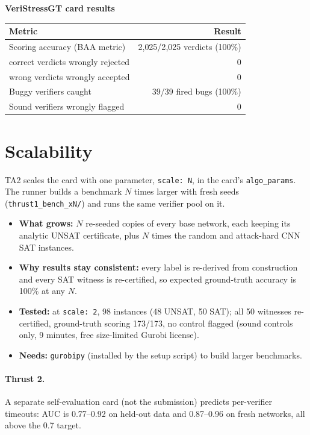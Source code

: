 \documentclass[11pt]{article}
\newcommand{\code}[1]{\texttt{#1}}
\begin{document}
\medskip\noindent\begin{minipage}{\linewidth}
\textbf{VeriStressGT card results}
\begin{center}\small
\begin{tabular}{@{}lr@{}}
\toprule
Metric & Result \\
\midrule
Scoring accuracy (BAA metric) & 2{,}025/2{,}025 verdicts (100\%) \\
\quad correct verdicts wrongly rejected & 0 \\
\quad wrong verdicts wrongly accepted & 0 \\
Buggy verifiers caught & 39/39 fired bugs (100\%) \\
Sound verifiers wrongly flagged & 0 \\
\bottomrule
\end{tabular}
\end{center}
\end{minipage}

\section{Scalability}
TA2 scales the card with one parameter, \code{scale: N}, in the card's \code{algo\_params}. The
runner builds a benchmark $N$ times larger with fresh seeds (\code{thrust1\_bench\_xN/}) and runs
the same verifier pool on it.
\begin{itemize}
  \item \textbf{What grows:} $N$ re-seeded copies of every base network, each keeping its analytic
  UNSAT certificate, plus $N$ times the random and attack-hard CNN SAT instances.
  \item \textbf{Why results stay consistent:} every label is re-derived from construction and every
  SAT witness is re-certified, so expected ground-truth accuracy is 100\% at any $N$.
  \item \textbf{Tested:} at \code{scale: 2}, 98 instances (48 UNSAT, 50 SAT); all 50 witnesses
  re-certified, ground-truth scoring 173/173, no control flagged (sound controls only, 9 minutes,
  free size-limited Gurobi license).
  \item \textbf{Needs:} \code{gurobipy} (installed by the setup script) to build larger benchmarks.
\end{itemize}

\paragraph{Thrust 2.} A separate self-evaluation card (not the submission) predicts per-verifier
timeouts: AUC is 0.77--0.92 on held-out data and 0.87--0.96 on fresh networks, all above the 0.7
target.
\end{document}
